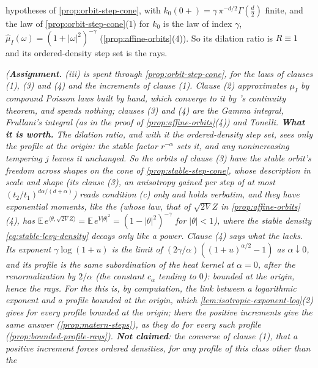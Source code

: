\begin{proposition}
\begin{enumerate}
hypotheses of \ref{prop:orbit-step-cone}, with $k_0(0{+}) = \gamma\,\pi^{-d/2}\Gamma(\tfrac d2)$
finite, and the law of \ref{prop:orbit-step-cone}(1) for $k_0$ is the \Matern{} law of index
$\gamma$, $\widehat\mu_I(\omega) = (1 + |\omega|^2)^{-\gamma}$ (\ref{prop:affine-orbits}(4)). So its
dilation ratio is $R \equiv 1$ and its ordered-density step set is the rays.
\end{enumerate}
\statusA\quad{}\quad\emph{(\textbf{Assignment.} (iii) is spent through
\ref{prop:orbit-step-cone}, for the laws of clauses (1), (3) and (4) and the increments of clause
(1). Clause (2) approximates $\mu_I$ by compound Poisson laws built by hand, which converge to it by
\Levy{}'s continuity theorem, and spends nothing; clauses (3) and (4) are the Gamma integral,
Frullani's integral (as in the proof of \ref{prop:affine-orbits}(4)) and Tonelli. \textbf{What it is worth.} The dilation
ratio, and with it the ordered-density step set, sees only the profile at the origin: the stable factor
$r^{-\alpha}$ sets it, and any nonincreasing tempering $j$ leaves it unchanged. So the orbits of
clause (3) have the stable orbit's freedom across shapes on the cone of \ref{prop:stable-step-cone},
whose description in scale and shape (its clause (3), an anisotropy gained per step of at most
$(t_2/t_1)^{d\alpha/(d+\alpha)}$) reads condition (c) only and holds verbatim, and they have
exponential moments, like the \Matern{} (whose law, that of $\sqrt{2V}Z$ in
\ref{prop:affine-orbits}(4), has $\mathbb{E}\,e^{\langle\theta,\sqrt{2V}Z\rangle} =
\mathbb{E}\,e^{V|\theta|^2} = (1 - |\theta|^2)^{-\gamma}$ for $|\theta| < 1$), where the stable \Levy{} density
\ref{eq:stable-levy-density} decays only like a power. Clause
(4) says what the \Matern{} lacks. Its exponent $\gamma\log(1 + u)$ is the limit of
$(2\gamma/\alpha)((1+u)^{\alpha/2} - 1)$ as $\alpha \downarrow 0$, and its profile is the same
subordination of the heat kernel at $\alpha = 0$, after the renormalization by $2/\alpha$ (the constant
$c_\alpha$ tending to $0$): bounded at the origin, hence the rays. For the
\Matern{} this is, by computation, the link between a logarithmic exponent and a profile bounded
at the origin, which \ref{lem:isotropic-exponent-log}(2) gives for every profile bounded at the
origin; there the positive increments give the same answer (\ref{prop:matern-steps}), as they do
for every such profile (\ref{prop:bounded-profile-rays}). \textbf{Not claimed}: the converse of clause (1),
that a positive increment forces ordered densities, for any profile of this class other than the
}
\end{proposition}

